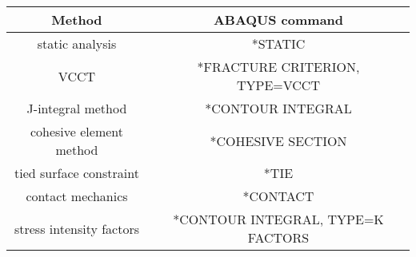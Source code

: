 \begin{table}[htbp]
\footnotesize
  \centering
    \begin{tabularx}{\textwidth}{cc}
    \toprule
  \textbf{Method}&  \textbf{ABAQUS command}\\
    \midrule
static analysis&*STATIC\\
VCCT&*FRACTURE CRITERION, TYPE=VCCT\\
J-integral method&*CONTOUR INTEGRAL\\
cohesive element method&*COHESIVE SECTION\\
tied surface constraint&*TIE\\
contact mechanics&*CONTACT\\
stress intensity factors&*CONTOUR INTEGRAL, TYPE=K FACTORS\\
    \bottomrule
    \end{tabularx}%
  \label{tab:command_tab}%
\end{table}%